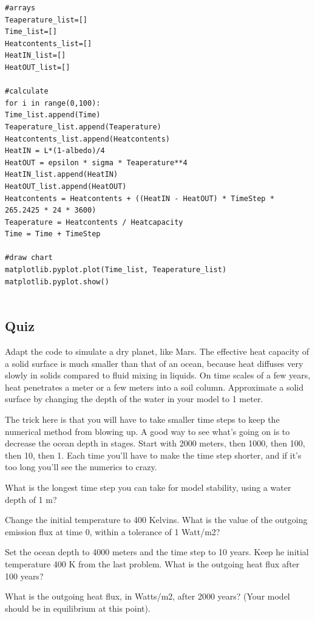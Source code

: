 {\begin{code}[흑체 복사평형 온도]
\begin{lstlisting}
#arrays
Teaperature_list=[]
Time_list=[]
Heatcontents_list=[]
HeatIN_list=[]
HeatOUT_list=[]

#calculate
for i in range(0,100):
Time_list.append(Time)
Teaperature_list.append(Teaperature)
Heatcontents_list.append(Heatcontents)
HeatIN = L*(1-albedo)/4
HeatOUT = epsilon * sigma * Teaperature**4
HeatIN_list.append(HeatIN)
HeatOUT_list.append(HeatOUT)
Heatcontents = Heatcontents + ((HeatIN - HeatOUT) * TimeStep * 265.2425 * 24 * 3600)
Teaperature = Heatcontents / Heatcapacity
Time = Time + TimeStep

#draw chart
matplotlib.pyplot.plot(Time_list, Teaperature_list)
matplotlib.pyplot.show()
	
	\end{lstlisting}
\end{code}

\subsection{Quiz}\index{}
Adapt the code to simulate a dry planet, like Mars. The effective heat capacity of a solid surface is much smaller than that of an ocean, because heat diffuses very slowly in solids compared to fluid mixing in liquids. On time scales of a few years, heat penetrates a meter or a few meters into a soil column. Approximate a solid surface by changing the depth of the water in your model to 1 meter.

The trick here is that you will have to take smaller time steps to keep the numerical method from blowing up. A good way to see what's going on is to decrease the ocean depth in stages. Start with 2000 meters, then 1000, then 100, then 10, then 1. Each time you'll have to make the time step shorter, and if it's too long you'll see the numerics to crazy.

What is the longest time step you can take for model stability, using a water depth of 1 m?



Change the initial temperature to 400 Kelvins. What is the value of the outgoing emission flux at time 0, within a tolerance of 1 Watt/m2?



Set the ocean depth to 4000 meters and the time step to 10 years. Keep he initial temperature 400 K from the last problem. What is the outgoing heat flux after 100 years?



What is the outgoing heat flux, in Watts/m2, after 2000 years? (Your model should be in equilibrium at this point).




}
